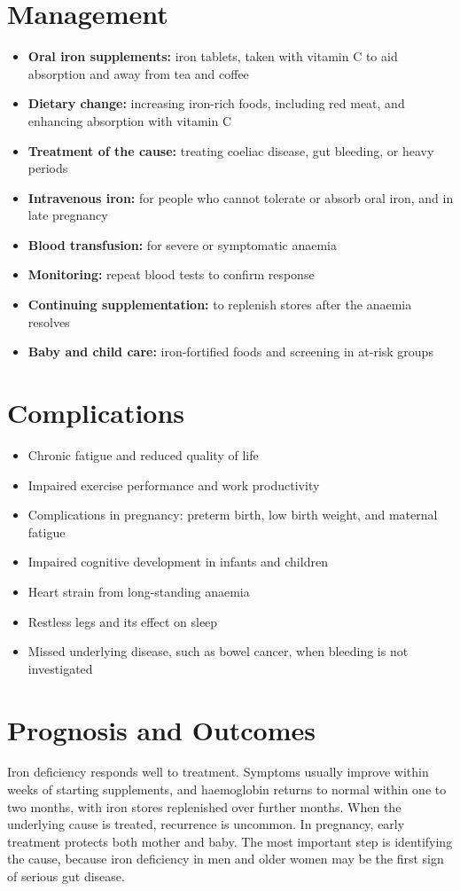 \section*{Management}
\begin{itemize}
    \item \textbf{Oral iron supplements:} iron tablets, taken with vitamin C to aid absorption and away from tea and coffee
    \item \textbf{Dietary change:} increasing iron-rich foods, including red meat, and enhancing absorption with vitamin C
    \item \textbf{Treatment of the cause:} treating coeliac disease, gut bleeding, or heavy periods
    \item \textbf{Intravenous iron:} for people who cannot tolerate or absorb oral iron, and in late pregnancy
    \item \textbf{Blood transfusion:} for severe or symptomatic anaemia
    \item \textbf{Monitoring:} repeat blood tests to confirm response
    \item \textbf{Continuing supplementation:} to replenish stores after the anaemia resolves
    \item \textbf{Baby and child care:} iron-fortified foods and screening in at-risk groups
\end{itemize}

\section*{Complications}
\begin{itemize}
    \item Chronic fatigue and reduced quality of life
    \item Impaired exercise performance and work productivity
    \item Complications in pregnancy: preterm birth, low birth weight, and maternal fatigue
    \item Impaired cognitive development in infants and children
    \item Heart strain from long-standing anaemia
    \item Restless legs and its effect on sleep
    \item Missed underlying disease, such as bowel cancer, when bleeding is not investigated
\end{itemize}

\section*{Prognosis and Outcomes}
Iron deficiency responds well to treatment. Symptoms usually improve within weeks of starting supplements, and haemoglobin returns to normal within one to two months, with iron stores replenished over further months. When the underlying cause is treated, recurrence is uncommon. In pregnancy, early treatment protects both mother and baby. The most important step is identifying the cause, because iron deficiency in men and older women may be the first sign of serious gut disease.

